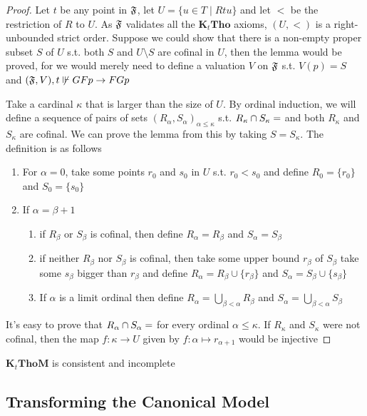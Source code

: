 \documentclass[11pt]{article}
\newcommand{\KtTho}{\textbf{K}_t\textbf{Tho}}
\newcommand{\KtThoM}{\textbf{K}_t\textbf{ThoM}}
\begin{document}
\begin{proof}
Let \(t\) be any point in \(\mathfrak{F}\), let \(U=\{u\in T\mid Rtu\}\) and let \(<\)
be the restriction of \(R\) to \(U\). As \(\mathfrak{F}\) validates all the \(\KtTho\)
axioms, \((U,<)\) is a right-unbounded strict order. Suppose we could show
that there is a non-empty proper subset \(S\) of \(U\) s.t. both \(S\) and
\(U\setminus S\) are cofinal in \(U\), then the lemma would be proved, for we
would merely need to define a valuation \(V\) on \(\mathfrak{F}\) s.t. \(V(p)=S\) and
\((\mathfrak{F},V),t\not\Vdash GFp\to FGp\)

Take a cardinal \(\kappa\) that is larger than the size of \(U\). By ordinal
induction, we will define a sequence of pairs of sets
\((R_\alpha,S_\alpha)_{\alpha\le\kappa}\) s.t. \(R_\kappa\cap
   S_\kappa=\empty\) and both \(R_\kappa\) and \(S_\kappa\) are cofinal. We can
prove the lemma from this by taking \(S=S_\kappa\). The definition is as
follows
\begin{enumerate}
\item For \(\alpha=0\), take some points \(r_0\) and \(s_0\) in \(U\) s.t.
\(r_0<s_0\) and define \(R_0=\{r_0\}\) and \(S_0=\{s_0\}\)
\item If \(\alpha=\beta+1\)
\begin{enumerate}
\item if \(R_\beta\) or \(S_\beta\) is cofinal, then define
\(R_\alpha=R_\beta\) and \(S_\alpha=S_\beta\)
\item if neither \(R_\beta\) nor \(S_\beta\) is cofinal, then take some upper
bound \(r_\beta\) of \(S_\beta\) take some \(s_\beta\) bigger than
\(r_\beta\) and define \(R_\alpha=R_\beta\cup\{r_\beta\}\) and \(S_\alpha=S_\beta\cup\{s_\beta\}\)
\item If \(\alpha\) is a limit ordinal then define \(R_\alpha=\bigcup_{\beta<\alpha}R_\beta\)
and \(S_\alpha=\bigcup_{\beta<\alpha}S_\beta\)
\end{enumerate}
\end{enumerate}


It's easy to prove that \(R_\alpha\cap S_\alpha=\empty\) for every ordinal
\(\alpha\le\kappa\). If \(R_\kappa\) and \(S_\kappa\) were not cofinal, then
the map \(f:\kappa\to U\) given by \(f:\alpha\mapsto r_{\alpha+1}\) would be injective
\end{proof}

\begin{theorem}[]
\(\KtThoM\) is consistent and incomplete
\end{theorem}
\subsection{Transforming the Canonical Model}
\label{sec:org74b3891}
\end{document}
